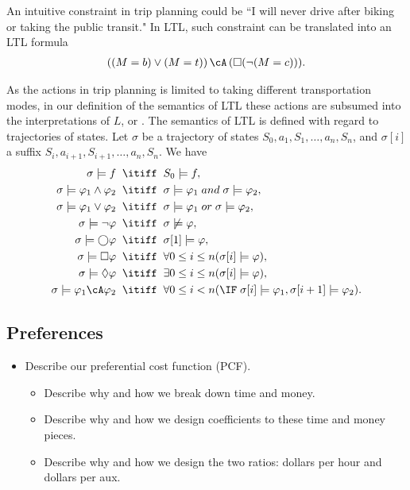 An intuitive constraint in trip planning could be ``I will never drive after biking or
taking the public transit."
In LTL, such constraint can be translated into an LTL formula
\begin{align*}
	((M=b) \lor (M=t)) \,\cA\, (\Box (\neg (M=c))).
\end{align*}

As the actions in trip planning is limited to taking different transportation modes,
in our definition of the semantics of LTL
these actions are subsumed into the interpretations of $L$, or .
The semantics of LTL is defined with regard to trajectories of states. 
Let $\sigma$ be a trajectory of states $S_0,a_1,S_1,\ldots,a_n,S_n$, and
$\sigma[i]$ a suffix $S_i, a_{i+1}, S_{i+1}, \ldots,a_n,S_n$.  We have
\begin{align*}
	\sigma \models f \;\; &\itiff \;\; S_0 \models f,\\
	\sigma \models \varphi_1 \land \varphi_2 \;\; &\itiff \;\; \sigma \models \varphi_1 \; and \; \sigma \models \varphi_2,\\
	\sigma \models \varphi_1 \lor \varphi_2 \;\; &\itiff \;\; \sigma \models \varphi_1 \; or \; \sigma \models \varphi_2,\\
	\sigma \models \neg \varphi \;\; &\itiff \;\; \sigma \not \models \varphi,\\
	\sigma \models \bigcirc \varphi \;\; &\itiff \;\; \sigma[1] \models \varphi,\\
	\sigma \models \Box \varphi \;\; &\itiff \;\; \forall 0 \leq i \leq n (\sigma[i] \models \varphi),\\
	\sigma \models \Diamond \varphi \;\; &\itiff \;\; \exists 0 \leq i \leq n (\sigma[i] \models \varphi),\\
	\sigma \models \varphi_1 \cA \varphi_2 \;\; &\itiff \;\; \forall 0 \leq i < n (\IF \; \sigma[i] \models \varphi_1, \sigma[i+1] \models \varphi_2).
\end{align*}


\subsection{Preferences}
\begin{itemize}
	\setlength\itemsep{1pt}
	\item Describe our preferential cost function (PCF).
	\begin{itemize}
		\setlength\itemsep{0pt}
		\item Describe why and how we break down time and money.
		\item Describe why and how we design coefficients to these time and money pieces.
		\item Describe why and how we design the two ratios: dollars per hour and dollars per aux.
	\end{itemize}
\end{itemize}

